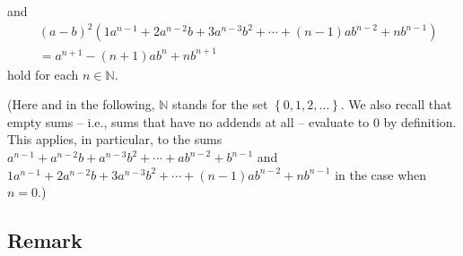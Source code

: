 \documentclass[paper=a4, fontsize=12pt]{scrartcl} %
\newcommand{\NN}{\mathbb{N}} %
\newcommand{\set}[1]{\left\{ #1 \right\}}
\newcommand{\tup}[1]{\left( #1 \right)}
\theoremstyle{plainsl}
\theoremstyle{definition}
\theoremstyle{remark}
\begin{document}
and
\begin{align}
& \tup{a-b}^2 \tup{ 1 a^{n-1} + 2 a^{n-2} b + 3 a^{n-3} b^2 + \cdots + \tup{n-1} a b^{n-2} + n b^{n-1} } \nonumber \\
&= a^{n+1} - \tup{n+1} a b^n + n b^{n+1}
\label{eq.exe.geo-series.2}
\end{align}
hold for each $n \in \NN$.

(Here and in the following, $\NN$ stands for the set
$\set{0, 1, 2, \ldots}$.
We also recall that empty sums -- i.e., sums that have no
addends at all -- evaluate to $0$ by definition. This applies,
in particular, to the sums
$a^{n-1} + a^{n-2} b + a^{n-3} b^2 + \cdots + a b^{n-2} + b^{n-1}$
and
$1 a^{n-1} + 2 a^{n-2} b + 3 a^{n-3} b^2 + \cdots + \tup{n-1} a b^{n-2} + n b^{n-1}$
in the case when $n = 0$.)

\subsection{Remark}
\end{document}
